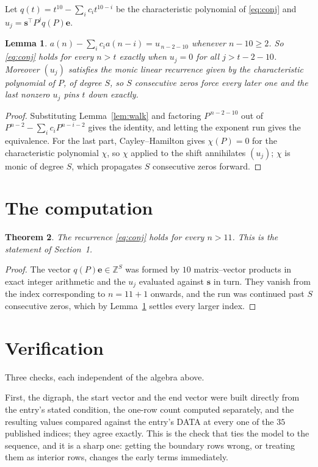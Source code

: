 \documentclass[11pt,a4paper]{article}
\theoremstyle{plain}
\newtheorem{theorem}{Theorem}
\newtheorem{lemma}[theorem]{Lemma}
\theoremstyle{definition}
\begin{document}
Let $q(t)=t^{10}-\sum_i c_i t^{10-i}$ be the characteristic polynomial of
\eqref{eq:conj} and $u_j=\mathbf{s}^{\!\top}P^{j}q(P)\mathbf{e}$.

\begin{lemma}\label{lem:crit}
$a(n)-\sum_i c_i a(n-i)=u_{\,n-2-10}$ whenever $n-10\ge2$. So \eqref{eq:conj}
holds for every $n>t$ exactly when $u_j=0$ for all $j>t-2-10$. Moreover $(u_j)$
satisfies the monic linear recurrence given by the characteristic polynomial of $P$, of
degree $S$, so $S$ consecutive zeros force every later one and the last nonzero $u_j$ pins
$t$ down exactly.
\end{lemma}

\begin{proof}
Substituting Lemma~\ref{lem:walk} and factoring $P^{\,n-2-10}$ out of
$P^{n-2}-\sum_i c_i P^{n-i-2}$ gives the identity, and letting the exponent run gives the
equivalence. For the last part, Cayley--Hamilton gives $\chi(P)=0$ for the characteristic
polynomial $\chi$, so $\chi$ applied to the shift annihilates $(u_j)$; $\chi$ is monic of
degree $S$, which propagates $S$ consecutive zeros forward.
\end{proof}

\section{The computation}

\begin{theorem}
The recurrence \eqref{eq:conj} holds for every $n>11$. This is the statement of
Section~1.
\end{theorem}

\begin{proof}
The vector $q(P)\mathbf{e}\in\mathbb{Z}^{S}$ was formed by $10$ matrix--vector
products in exact integer arithmetic and the $u_j$ evaluated against $\mathbf{s}$ in turn.
They vanish from the index corresponding to $n=11+1$ onwards, and the run was continued
past $S$ consecutive zeros, which by Lemma~\ref{lem:crit} settles every larger index.
\end{proof}

\section{Verification}

Three checks, each independent of the algebra above.

First, the digraph, the start vector and the end vector were built directly from the
entry's stated condition, the one-row count computed separately, and the resulting values
compared against the entry's DATA at every one of the $35$ published indices; they
agree exactly. This is the check that ties the model to the sequence, and it is a sharp one:
getting the boundary rows wrong, or treating them as interior rows, changes the early terms
immediately.
\end{document}
